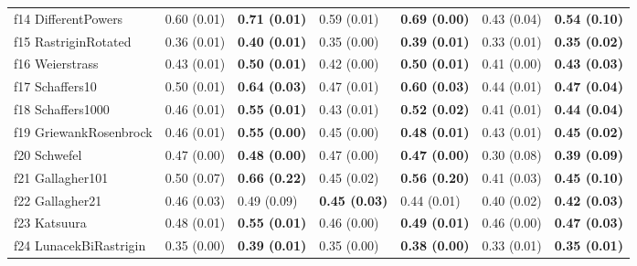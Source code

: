 \begin{table}
\begin{tabular}{lllllll}
f14 DifferentPowers & 0.60 (0.01) & \textbf{0.71 (0.01)} & 0.59 (0.01) & \textbf{0.69 (0.00)} & 0.43 (0.04) & \textbf{0.54 (0.10)} \\
f15 RastriginRotated & 0.36 (0.01) & \textbf{0.40 (0.01)} & 0.35 (0.00) & \textbf{0.39 (0.01)} & 0.33 (0.01) & \textbf{0.35 (0.02)} \\
f16 Weierstrass & 0.43 (0.01) & \textbf{0.50 (0.01)} & 0.42 (0.00) & \textbf{0.50 (0.01)} & 0.41 (0.00) & \textbf{0.43 (0.03)} \\
f17 Schaffers10 & 0.50 (0.01) & \textbf{0.64 (0.03)} & 0.47 (0.01) & \textbf{0.60 (0.03)} & 0.44 (0.01) & \textbf{0.47 (0.04)} \\
f18 Schaffers1000 & 0.46 (0.01) & \textbf{0.55 (0.01)} & 0.43 (0.01) & \textbf{0.52 (0.02)} & 0.41 (0.01) & \textbf{0.44 (0.04)} \\
f19 GriewankRosenbrock & 0.46 (0.01) & \textbf{0.55 (0.00)} & 0.45 (0.00) & \textbf{0.48 (0.01)} & 0.43 (0.01) & \textbf{0.45 (0.02)} \\
f20 Schwefel & 0.47 (0.00) & \textbf{0.48 (0.00)} & 0.47 (0.00) & \textbf{0.47 (0.00)} & 0.30 (0.08) & \textbf{0.39 (0.09)} \\
f21 Gallagher101 & 0.50 (0.07) & \textbf{0.66 (0.22)} & 0.45 (0.02) & \textbf{0.56 (0.20)} & 0.41 (0.03) & \textbf{0.45 (0.10)} \\
f22 Gallagher21 & 0.46 (0.03) & 0.49 (0.09) & \textbf{0.45 (0.03)} & 0.44 (0.01) & 0.40 (0.02) & \textbf{0.42 (0.03)} \\
f23 Katsuura & 0.48 (0.01) & \textbf{0.55 (0.01)} & 0.46 (0.00) & \textbf{0.49 (0.01)} & 0.46 (0.00) & \textbf{0.47 (0.03)} \\
f24 LunacekBiRastrigin & 0.35 (0.00) & \textbf{0.39 (0.01)} & 0.35 (0.00) & \textbf{0.38 (0.00)} & 0.33 (0.01) & \textbf{0.35 (0.01)} \\
\bottomrule
\end{tabular}
\end{table}
